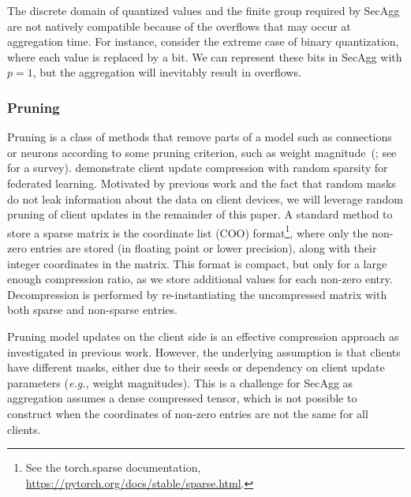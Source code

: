 \documentclass[11pt]{article}
\makeatletter
\newcommand{\SecAgg}{{\sc SecAgg}\xspace}
\def\eg{\textit{e.g.,}\@\xspace}
\newcommand{\sayan}[1]{{\color{red}Sayan: #1}}
\newcommand{\karthik}[1]{{\color{blue}Karthik: #1}}
\newcommand{\modif}[1]{{\color{black}#1}}
\makeatother
\begin{document}
The discrete domain of quantized values and the finite group required by \SecAgg are not natively compatible because of the overflows that may occur at aggregation time. For instance, consider the extreme case of binary quantization, where each value is replaced by a bit.
We can represent these bits in \SecAgg with $p=1$, but the aggregation will inevitably result in overflows.

\subsubsection{Pruning}
\label{subsec:rp}

Pruning is a class of methods that remove parts of a model such as connections or neurons according to some pruning criterion, such as weight magnitude~(\cite{Graham-lecun1990optimal,Graham-hassabi1992second}; see \cite{Graham-Blalock20} for a survey). \cite{Graham-konen2016federated} demonstrate client update compression with random sparsity for federated learning. Motivated by previous work and the fact that random masks do not leak information about the data on client devices, we will leverage random pruning of client updates in the remainder of this paper.
A standard method to store a sparse matrix is the coordinate list (COO) format\footnote{See the  {torch.sparse documentation}, \url{https://pytorch.org/docs/stable/sparse.html}.}, where only the non-zero entries are stored (in floating point or lower precision), along with their integer coordinates in the matrix.
This format is compact, but only for a large enough compression ratio, as we store additional values for each non-zero entry.
Decompression is performed by re-instantiating the uncompressed matrix with both sparse and non-sparse entries.

\modif{Pruning model updates on the client side is an effective compression approach} as investigated in previous work. However, the underlying assumption is that clients have different masks, either due to their seeds or dependency on client update parameters (\eg weight magnitudes). This is a challenge for \SecAgg as aggregation assumes a dense compressed tensor, which is not possible to construct when the coordinates of non-zero entries are not the same for all clients.
\end{document}
